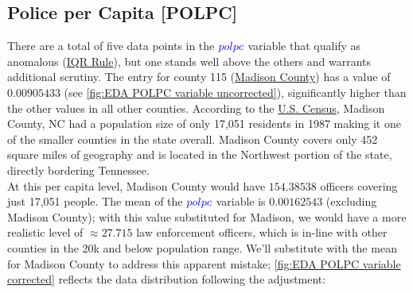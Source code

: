 \pagebreak

\subsection{Police per Capita [POLPC]}

There are a total of five data points in the $\textcolor{Blue}{polpc}$ variable that qualify as anomalous (\href{https://en.wikipedia.org/wiki/Outlier}{IQR Rule}), but one stands well above the others and warrants additional scrutiny.  The entry for county 115 (\href{https://www.madisoncountync.gov/}{Madison County}) has a value of $0.00905433$ (see \ref{fig:EDA POLPC variable uncorrected}), significantly higher than the other values in all other counties.  According to the \href{https://www.google.com/publicdata/explore?ds=kf7tgg1uo9ude_&met_y=population&idim=county:37173&hl=en&dl=en#!ctype=l&strail=false&bcs=d&nselm=h&met_y=population&scale_y=lin&ind_y=false&rdim=country&idim=county:37115&ifdim=country&hl=en_US&dl=en&ind=false}{U.S. Census}, Madison County, NC had a population size of only 17,051 residents in 1987 making it one of the smaller counties in the state overall.  Madison County covers only 452 square miles of geography and is located in the Northwest portion of the state, directly bordering Tennessee.\\

At this per capita level, Madison County would have $154.38538$ officers covering just 17,051 people.  The mean of the $\textcolor{Blue}{polpc}$ variable is $0.00162543$ (excluding Madison County); with this value substituted for Madison, we would have a more realistic level of $\approx 27.715$ law enforcement officers, which is in-line with other counties in the 20k and below population range.  We'll substitute with the mean for Madison County to address this apparent mistake; \ref{fig:EDA POLPC variable corrected} reflects the data distribution following the adjustment:\\

